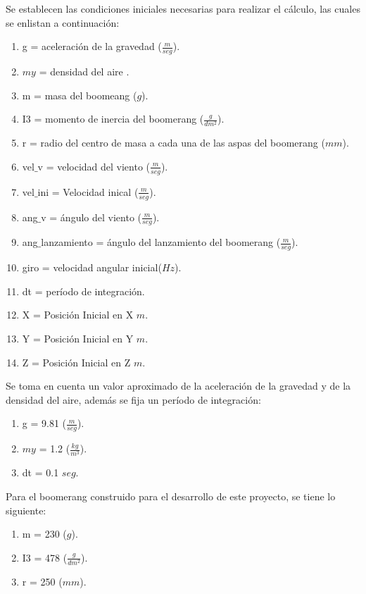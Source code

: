 	Se establecen las condiciones iniciales necesarias para realizar el cálculo, las cuales se enlistan a continuación:

		\begin{enumerate}
		\item{g = aceleración de la gravedad {($\frac{m}{seg}$)}.}
		\item{$my$ = densidad del aire .}
		\item{m = masa del boomeang {($g$)}.}
		\item{I3 = momento de inercia del boomerang {($\frac{g}{dm^{2}}$)}.}
		\item{r = radio del centro de masa a cada una de las aspas del boomerang {($mm$)}.}
		\item{vel$\_$v = velocidad del viento {($\frac{m}{seg}$)}.}
		\item{vel$\_$ini = Velocidad inical {($\frac{m}{seg}$)}.}
		\item{ang$\_$v = ángulo del viento {($\frac{m}{seg}$)}.}
  		\item{ang$\_$lanzamiento = ángulo del lanzamiento del boomerang {($\frac{m}{seg}$)}.}
		\item{giro = velocidad angular inicial{($Hz$)}.}
		\item{dt = período de integración.}
     	\item{X = Posición Inicial en X $m$.}
     	\item{Y = Posición Inicial en Y $m$.}
     	\item{Z = Posición Inicial en Z $m$.}
		\end{enumerate}

	Se toma en cuenta un valor aproximado de la aceleración de la gravedad y de la densidad del aire, además se fija un período de integración:

		\begin{enumerate}
		\item{g = 9.81 {($\frac{m}{seg}$)}.}
		\item{$my$ = 1.2 ($\frac{kg}{m^{3}}$).}
		\item{dt = 0.1 $seg$.}
		\end{enumerate}

	Para el boomerang construido para el desarrollo de este proyecto, se tiene lo siguiente:

		\begin{enumerate}
		\item{m = 230 {($g$)}.}
		\item{I3 = 478 {($\frac{g}{dm^{2}}$)}.}
		\item{r = 250 {($mm$)}.}
		\end{enumerate}


